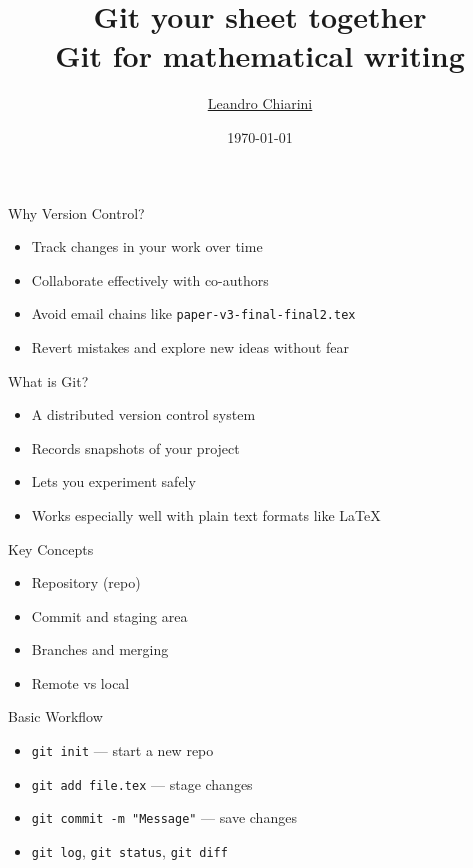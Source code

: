 \documentclass[12pt,t]{beamer}
\title{{\Huge Git your sheet together} \\ Git for mathematical writing}
\author{\href{http://lchiarini.com}{Leandro Chiarini}}
\institute{Durham University}
\date{\today \\
	\vspace{2em}
}
\begin{document}
{
\frame{ \titlepage
   } }

\begin{frame}{Why Version Control?}
\begin{itemize}
    \item Track changes in your work over time
		\pause
    \item Collaborate effectively with co-authors
		\pause
    \item Avoid email chains like \texttt{paper-v3-final-final2.tex}
		\pause
    \item Revert mistakes and explore new ideas without fear
\end{itemize}
\end{frame}

\begin{frame}{What is Git?}
\begin{itemize}
    \item A distributed version control system
		\pause
    \item Records snapshots of your project
		\pause
    \item Lets you experiment safely
		\pause
    \item Works especially well with plain text formats like \LaTeX
\end{itemize}
\end{frame}

\begin{frame}{Key Concepts}
\begin{itemize}
    \item Repository (repo)
		\pause
    \item Commit and staging area
		\pause
    \item Branches and merging
		\pause
    \item Remote vs local
\end{itemize}
\end{frame}

\begin{frame}{Basic Workflow}
\begin{itemize}
    \item \texttt{git init} --- start a new repo
		\pause
    \item \texttt{git add file.tex} --- stage changes
		\pause
    \item \texttt{git commit -m "Message"} --- save changes
		\pause
    \item \texttt{git log}, \texttt{git status}, \texttt{git diff}
\end{itemize}
\end{frame}
\end{document}
